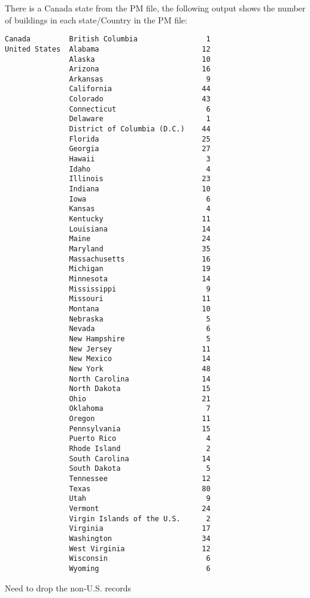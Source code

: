 \documentclass[12pt]{article}
\begin{document}
There is a Canada state from the PM file, the following output shows
the number of buildings in each state/Country in the PM file:
\begin{verbatim}
Canada         British Columbia                1
United States  Alabama                        12
               Alaska                         10
               Arizona                        16
               Arkansas                        9
               California                     44
               Colorado                       43
               Connecticut                     6
               Delaware                        1
               District of Columbia (D.C.)    44
               Florida                        25
               Georgia                        27
               Hawaii                          3
               Idaho                           4
               Illinois                       23
               Indiana                        10
               Iowa                            6
               Kansas                          4
               Kentucky                       11
               Louisiana                      14
               Maine                          24
               Maryland                       35
               Massachusetts                  16
               Michigan                       19
               Minnesota                      14
               Mississippi                     9
               Missouri                       11
               Montana                        10
               Nebraska                        5
               Nevada                          6
               New Hampshire                   5
               New Jersey                     11
               New Mexico                     14
               New York                       48
               North Carolina                 14
               North Dakota                   15
               Ohio                           21
               Oklahoma                        7
               Oregon                         11
               Pennsylvania                   15
               Puerto Rico                     4
               Rhode Island                    2
               South Carolina                 14
               South Dakota                    5
               Tennessee                      12
               Texas                          80
               Utah                            9
               Vermont                        24
               Virgin Islands of the U.S.      2
               Virginia                       17
               Washington                     34
               West Virginia                  12
               Wisconsin                       6
               Wyoming                         6
\end{verbatim}

Need to drop the non-U.S. records
\newpage
 
\end{document}
